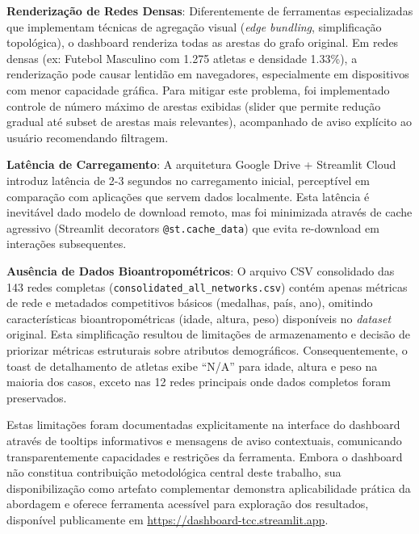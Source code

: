 \textbf{Renderização de Redes Densas}: Diferentemente de ferramentas especializadas que implementam técnicas de agregação visual (\textit{edge bundling}, simplificação topológica), o dashboard renderiza todas as arestas do grafo original. Em redes densas (ex: Futebol Masculino com 1.275 atletas e densidade 1.33\%), a renderização pode causar lentidão em navegadores, especialmente em dispositivos com menor capacidade gráfica. Para mitigar este problema, foi implementado controle de número máximo de arestas exibidas (slider que permite redução gradual até subset de arestas mais relevantes), acompanhado de aviso explícito ao usuário recomendando filtragem.

\textbf{Latência de Carregamento}: A arquitetura Google Drive + Streamlit Cloud introduz latência de 2-3 segundos no carregamento inicial, perceptível em comparação com aplicações que servem dados localmente. Esta latência é inevitável dado modelo de download remoto, mas foi minimizada através de cache agressivo (Streamlit decorators \texttt{@st.cache\_data}) que evita re-download em interações subsequentes.

\textbf{Ausência de Dados Bioantropométricos}: O arquivo CSV consolidado das 143 redes completas (\texttt{consolidated\_all\_networks.csv}) contém apenas métricas de rede e metadados competitivos básicos (medalhas, país, ano), omitindo características bioantropométricas (idade, altura, peso) disponíveis no \textit{dataset} original. Esta simplificação resultou de limitações de armazenamento e decisão de priorizar métricas estruturais sobre atributos demográficos. Consequentemente, o toast de detalhamento de atletas exibe ``N/A'' para idade, altura e peso na maioria dos casos, exceto nas 12 redes principais onde dados completos foram preservados.

Estas limitações foram documentadas explicitamente na interface do dashboard através de tooltips informativos e mensagens de aviso contextuais, comunicando transparentemente capacidades e restrições da ferramenta. Embora o dashboard não constitua contribuição metodológica central deste trabalho, sua disponibilização como artefato complementar demonstra aplicabilidade prática da abordagem e oferece ferramenta acessível para exploração dos resultados, disponível publicamente em \url{https://dashboard-tcc.streamlit.app}.